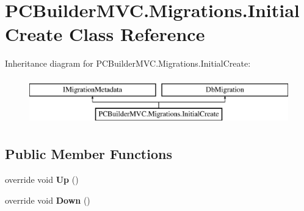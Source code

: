 \hypertarget{class_p_c_builder_m_v_c_1_1_migrations_1_1_initial_create}{}\section{P\+C\+Builder\+M\+V\+C.\+Migrations.\+Initial\+Create Class Reference}
\label{class_p_c_builder_m_v_c_1_1_migrations_1_1_initial_create}
Inheritance diagram for P\+C\+Builder\+M\+V\+C.\+Migrations.\+Initial\+Create\+:\begin{figure}[H]
\begin{center}
\leavevmode
\includegraphics[height=2.000000cm]{class_p_c_builder_m_v_c_1_1_migrations_1_1_initial_create}
\end{center}
\end{figure}
\subsection*{Public Member Functions}
\begin{DoxyCompactItemize}
\item 
override void {\bfseries Up} ()\hypertarget{class_p_c_builder_m_v_c_1_1_migrations_1_1_initial_create_ae19a5b764e8e812350c7ed3235ddd828}{}\label{class_p_c_builder_m_v_c_1_1_migrations_1_1_initial_create_ae19a5b764e8e812350c7ed3235ddd828}

\item 
override void {\bfseries Down} ()\hypertarget{class_p_c_builder_m_v_c_1_1_migrations_1_1_initial_create_aa37b4ae0ed69ba9868659227304c67c1}{}\label{class_p_c_builder_m_v_c_1_1_migrations_1_1_initial_create_aa37b4ae0ed69ba9868659227304c67c1}

\end{DoxyCompactItemize}

